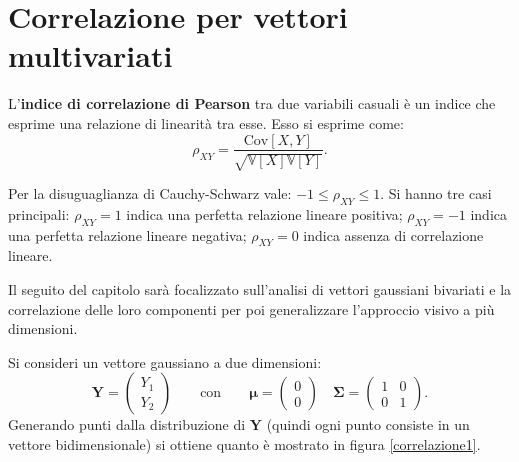 \newpage

\section{Correlazione per vettori multivariati} \label{sezioneCorrelazione}


\begin{defi}
L'\textbf{indice di correlazione di Pearson} tra due variabili casuali è un indice che esprime una relazione di linearità tra esse. Esso si esprime come:
\[ \rho_{XY}=\frac{\text{Cov}[X,Y]}{\sqrt{\mathbb{V}[X]\mathbb{V}[Y]}}.
\]
\end{defi}
\begin{oss}
Per la disuguaglianza di Cauchy-Schwarz vale: $-1\leq \rho_{XY}\leq 1$. Si hanno tre casi principali: $\rho_{XY}=1$ indica una perfetta relazione lineare positiva;  $\rho_{XY}=-1$ indica una perfetta relazione lineare negativa; $\rho_{XY}=0$ indica assenza di correlazione lineare. 
\end{oss}

Il seguito del capitolo sarà focalizzato sull'analisi di vettori gaussiani bivariati e la correlazione delle loro componenti per poi generalizzare l'approccio visivo a più dimensioni.

Si consideri un vettore gaussiano a due dimensioni: \[\mathbf{Y}=\begin{pmatrix}Y_1\\Y_2\end{pmatrix} \qquad\text{con} \qquad \bm{\mu} = \begin{pmatrix}0\\0\end{pmatrix} \quad \mathbf{\Sigma}=\begin{pmatrix}1&0\\0&1\end{pmatrix}.
\]
Generando punti dalla distribuzione di $\mathbf{Y}$ (quindi ogni punto consiste in un vettore bidimensionale) si ottiene quanto è mostrato in figura \ref{correlazione1}.

